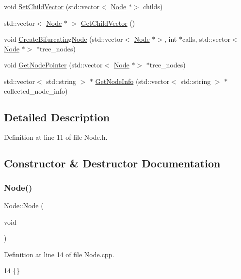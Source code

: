 \begin{DoxyCompactItemize}
\item 
void \hyperlink{classNode_a7480924f7879b04fe8c787f42ee888fe}{Set\+Child\+Vector} (std\+::vector$<$ \hyperlink{classNode}{Node} $\ast$$>$ childs)
\item 
std\+::vector$<$ \hyperlink{classNode}{Node} $\ast$ $>$ \hyperlink{classNode_a9b9823315fd95dcd24aac97316de2859}{Get\+Child\+Vector} ()
\item 
void \hyperlink{classNode_a188e5d00d54887dc3490837f2f025abf}{Create\+Bifurcating\+Node} (std\+::vector$<$ \hyperlink{classNode}{Node} $\ast$$>$, int $\ast$calls, std\+::vector$<$ \hyperlink{classNode}{Node} $\ast$$>$ $\ast$tree\+\_\+nodes)
\item 
void \hyperlink{classNode_a8e58dc16fc38e2076c7ddbe5b9f04177}{Get\+Node\+Pointer} (std\+::vector$<$ \hyperlink{classNode}{Node} $\ast$$>$ $\ast$tree\+\_\+nodes)
\item 
std\+::vector$<$ std\+::string $>$ $\ast$ \hyperlink{classNode_aeb57ef43b22fa37c2855ebb07e4e7331}{Get\+Node\+Info} (std\+::vector$<$ std\+::string $>$ $\ast$collected\+\_\+node\+\_\+info)
\end{DoxyCompactItemize}


\subsection{Detailed Description}


Definition at line 11 of file Node.\+h.



\subsection{Constructor \& Destructor Documentation}
\mbox{\label{classNode_ad7a34779cad45d997bfd6d3d8043c75f}} 
\subsubsection{\texorpdfstring{Node()}{Node()}}
{\footnotesize\ttfamily Node\+::\+Node (\begin{DoxyParamCaption}\item[{void}]{ }\end{DoxyParamCaption})}



Definition at line 14 of file Node.\+cpp.


\begin{DoxyCode}
14 \{\}
\end{DoxyCode}



